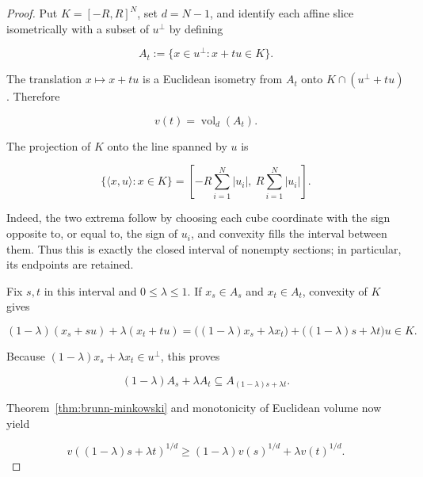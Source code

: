 \begin{proof}
Put \(K=[-R,R]^N\), set \(d=N-1\), and identify each affine slice isometrically with a subset of \(u^\perp\) by defining

\begin{equation}
\label{eq:appendix-display-152}
A_t:=\{x\in u^\perp:x+tu\in K\}.
\end{equation}

The translation \(x\mapsto x+tu\) is a Euclidean isometry from \(A_t\) onto \(K\cap(u^\perp+tu)\). Therefore

\begin{equation}
\label{eq:appendix-display-153}
v(t)=\operatorname{vol}_d(A_t).
\end{equation}

The projection of \(K\) onto the line spanned by \(u\) is

\begin{equation}
\label{eq:appendix-display-154}
\bigl\{\langle x,u\rangle:x\in K\bigr\}
=\left[-R\sum_{i=1}^N|u_i|,\ R\sum_{i=1}^N|u_i|\right].
\end{equation}

Indeed, the two extrema follow by choosing each cube coordinate with the sign opposite to, or equal to, the sign of \(u_i\), and convexity fills the interval between them. Thus this is exactly the closed interval of nonempty sections; in particular, its endpoints are retained.

Fix \(s,t\) in this interval and \(0\leq\lambda\leq1\). If \(x_s\in A_s\) and \(x_t\in A_t\), convexity of \(K\) gives

\begin{equation}
\label{eq:appendix-display-155}
(1-\lambda)(x_s+su)+\lambda(x_t+tu)
=\bigl((1-\lambda)x_s+\lambda x_t\bigr)
 +\bigl((1-\lambda)s+\lambda t\bigr)u\in K.
\end{equation}

Because \((1-\lambda)x_s+\lambda x_t\in u^\perp\), this proves

\begin{equation}
\label{eq:appendix-display-156}
(1-\lambda)A_s+\lambda A_t
\subseteq A_{(1-\lambda)s+\lambda t}.
\end{equation}

Theorem~\ref{thm:brunn-minkowski} and monotonicity of Euclidean volume now yield

\begin{equation}
\label{eq:appendix-display-157}
v((1-\lambda)s+\lambda t)^{1/d}
\geq(1-\lambda)v(s)^{1/d}+\lambda v(t)^{1/d}.
\end{equation}


\end{proof}
